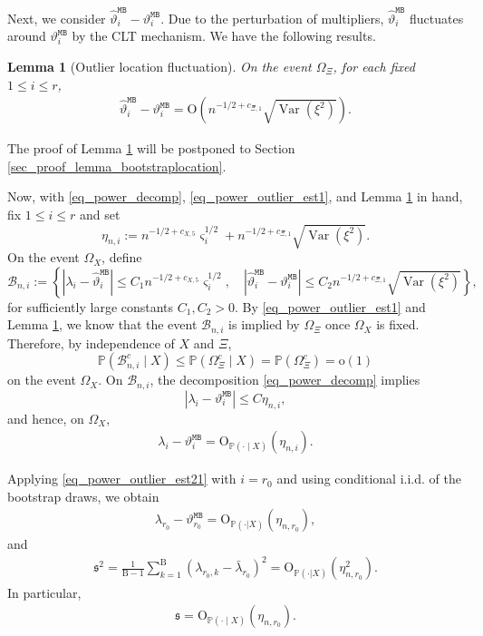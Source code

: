 \documentclass[12pt]{article}
\theoremstyle{plain}
\newtheorem{lemma}{Lemma}[section]
\numberwithin{equation}{section}
\begin{document}
Next, we consider $\widehat{\vartheta}_i^{\mathtt{MB}}-\vartheta_i^{\mathtt{MB}}$. Due to the perturbation of multipliers, $\widehat{\vartheta}_i^{\mathtt{MB}}$ fluctuates around $\vartheta_i^{\mathtt{MB}}$ by the CLT mechanism. We have the following results.
\begin{lemma}[Outlier location fluctuation]\label{lem_power_bootstrap_localization}
	On the event $\Omega_{\Xi}$, for each fixed $1\le i\le r$,
	\begin{align}\label{eq_power_bootstrap_localization}
		\widehat{\vartheta}_i^{\mathtt{MB}}-\vartheta_i^{\mathtt{MB}}=\mathrm{O}\left(n^{-1/2+c_{\Xi,1}}\sqrt{\operatorname{Var}(\xi^2)}\right).
	\end{align}
\end{lemma}
The proof of Lemma \ref{lem_power_bootstrap_localization} will be postponed to Section \ref{sec_proof_lemma_bootstraplocation}. 

Now, with \eqref{eq_power_decomp}, \eqref{eq_power_outlier_est1}, and Lemma \ref{lem_power_bootstrap_localization} in hand, fix $1\le i\le r$ and set
\[
\eta_{n,i}
:=
n^{-1/2+c_{X,5}}\varsigma_i^{1/2}
+
n^{-1/2+c_{\Xi,1}}\sqrt{\operatorname{Var}(\xi^2)}.
\]
On the event $\Omega_X$, define
\[
\mathcal B_{n,i}
:=
\left\{
\left|\lambda_i-\widehat{\vartheta}_i^{\mathtt{MB}}\right|
\le C_1 n^{-1/2+c_{X,5}}\varsigma_i^{1/2},
\quad
\left|\widehat{\vartheta}_i^{\mathtt{MB}}-\vartheta_i^{\mathtt{MB}}\right|
\le C_2 n^{-1/2+c_{\Xi,1}}\sqrt{\operatorname{Var}(\xi^2)}
\right\},
\]
for sufficiently large constants $C_1,C_2>0$. By \eqref{eq_power_outlier_est1} and Lemma \ref{lem_power_bootstrap_localization}, we know that the event $\mathcal B_{n,i}$ is implied by $\Omega_{\Xi}$ once $\Omega_X$ is fixed. Therefore, by independence of $X$ and $\Xi$,
\[
\mathbb P(\mathcal B_{n,i}^c\mid X)
\le
\mathbb P(\Omega_{\Xi}^c\mid X)
=
\mathbb P(\Omega_{\Xi}^c)
=
\mathrm o(1)
\]
on the event $\Omega_X$. On $\mathcal B_{n,i}$, the decomposition \eqref{eq_power_decomp} implies
\[
|\lambda_i-\vartheta_i^{\mathtt{MB}}|
\le C\eta_{n,i},
\]
and hence, on $\Omega_X$,
\begin{align}\label{eq_power_outlier_est21}
	\lambda_i-\vartheta_i^{\mathtt{MB}}
	=
	\mathrm O_{\mathbb P(\cdot\mid X)}(\eta_{n,i}).
\end{align}

Applying \eqref{eq_power_outlier_est21} with $i=r_0$ and using conditional i.i.d. of the bootstrap draws, we obtain
\begin{align}\label{eq_power_outlier_est2}
	\lambda_{r_0}-\vartheta_{r_0}^{\mathtt{MB}}=\mathrm{O}_{\mathbb{P}(\cdot|X)}(\eta_{n,r_0}),
\end{align}
and
\begin{align}\label{eq_power_width}
	\mathfrak{s}^2=\frac{1}{\mathrm{B}-1}\sum_{k=1}^{\mathrm{B}}(\lambda_{r_0,k}-\bar{\lambda}_{r_0})^2=\mathrm{O}_{\mathbb{P}(\cdot|X)}(\eta^2_{n,r_0}).
\end{align}
In particular,
\begin{align*}
	\mathfrak s
	=
	\mathrm O_{\mathbb P(\cdot\mid X)}(\eta_{n,r_0}).
\end{align*}
\end{document}
